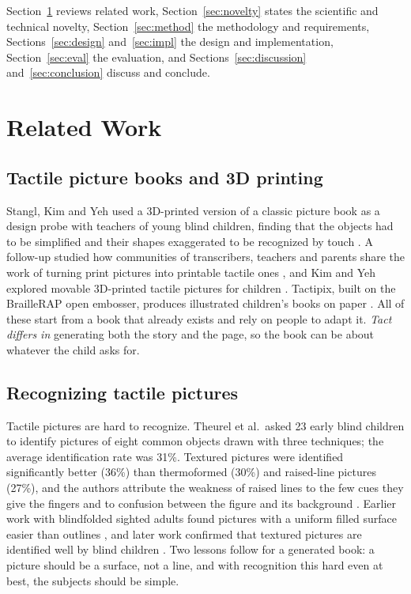 \documentclass[conference]{IEEEtran}
\begin{document}
Section~\ref{sec:related} reviews related work, Section~\ref{sec:novelty} states the scientific and technical novelty, Section~\ref{sec:method} the methodology and requirements, Sections~\ref{sec:design} and~\ref{sec:impl} the design and implementation, Section~\ref{sec:eval} the evaluation, and Sections~\ref{sec:discussion} and~\ref{sec:conclusion} discuss and conclude.

\section{Related Work}\label{sec:related}

\subsection{Tactile picture books and 3D printing}

Stangl, Kim and Yeh used a 3D-printed version of a classic picture book as a design probe with teachers of young blind children, finding that the objects had to be simplified and their shapes exaggerated to be recognized by touch \cite{stangl2014}. A follow-up studied how communities of transcribers, teachers and parents share the work of turning print pictures into printable tactile ones \cite{stangl2015}, and Kim and Yeh explored movable 3D-printed tactile pictures for children \cite{kim2015}. Tactipix, built on the BrailleRAP open embosser, produces illustrated children's books on paper \cite{braillerap}. All of these start from a book that already exists and rely on people to adapt it. \emph{Tact differs in} generating both the story and the page, so the book can be about whatever the child asks for.

\subsection{Recognizing tactile pictures}

Tactile pictures are hard to recognize. Theurel et al.\ asked 23 early blind children to identify pictures of eight common objects drawn with three techniques; the average identification rate was 31\%. Textured pictures were identified significantly better (36\%) than thermoformed (30\%) and raised-line pictures (27\%), and the authors attribute the weakness of raised lines to the few cues they give the fingers and to confusion between the figure and its background \cite{theurel2013}. Earlier work with blindfolded sighted adults found pictures with a uniform filled surface easier than outlines \cite{thompson2003}, and later work confirmed that textured pictures are identified well by blind children \cite{vinter2020}. Two lessons follow for a generated book: a picture should be a surface, not a line, and with recognition this hard even at best, the subjects should be simple.
\end{document}
